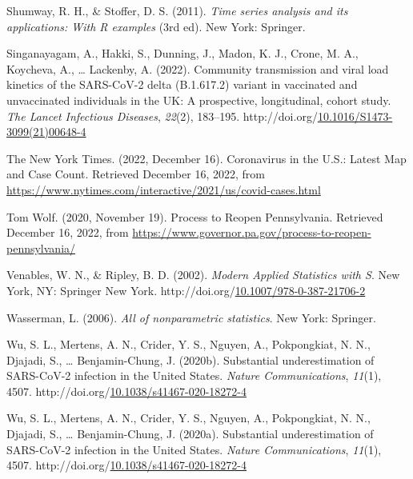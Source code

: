 \documentclass[12pt,twoside]{smiththesis}
\newlength{\cslhangindent}
\newenvironment{CSLReferences}[2] %
 {%
\setlength{\parindent}{0pt}
\ifodd #1 \everypar{\setlength{\hangindent}{\cslhangindent}}\ignorespaces\fi
\ifnum #2 > 0
\setlength{\parskip}{#2\baselineskip}
  \fi
}%
{}
\begin{document}
\begin{CSLReferences}{1}{0}
\leavevmode{}%
Shumway, R. H., \& Stoffer, D. S. (2011). \emph{Time series analysis and its applications: With {R} examples} (3rd ed). {New York}: {Springer}.

\leavevmode{}%
Singanayagam, A., Hakki, S., Dunning, J., Madon, K. J., Crone, M. A., Koycheva, A., \ldots{} Lackenby, A. (2022). Community transmission and viral load kinetics of the {SARS-CoV-2} delta ({B}.1.617.2) variant in vaccinated and unvaccinated individuals in the {UK}: A prospective, longitudinal, cohort study. \emph{The Lancet Infectious Diseases}, \emph{22}(2), 183--195. http://doi.org/\href{https://doi.org/10.1016/S1473-3099(21)00648-4}{10.1016/S1473-3099(21)00648-4}

\leavevmode{}%
The New York Times. (2022, December 16). Coronavirus in the {U}.{S}.: {Latest Map} and {Case Count}. Retrieved December 16, 2022, from \url{https://www.nytimes.com/interactive/2021/us/covid-cases.html}

\leavevmode{}%
Tom Wolf. (2020, November 19). Process to {Reopen Pennsylvania}. Retrieved December 16, 2022, from \url{https://www.governor.pa.gov/process-to-reopen-pennsylvania/}

\leavevmode{}%
Venables, W. N., \& Ripley, B. D. (2002). \emph{Modern {Applied Statistics} with {S}}. {New York, NY}: {Springer New York}. http://doi.org/\href{https://doi.org/10.1007/978-0-387-21706-2}{10.1007/978-0-387-21706-2}

\leavevmode{}%
Wasserman, L. (2006). \emph{All of nonparametric statistics}. {New York}: {Springer}.

\leavevmode{}%
Wu, S. L., Mertens, A. N., Crider, Y. S., Nguyen, A., Pokpongkiat, N. N., Djajadi, S., \ldots{} Benjamin-Chung, J. (2020b). Substantial underestimation of {SARS-CoV-2} infection in the {United States}. \emph{Nature Communications}, \emph{11}(1), 4507. http://doi.org/\href{https://doi.org/10.1038/s41467-020-18272-4}{10.1038/s41467-020-18272-4}

\leavevmode{}%
Wu, S. L., Mertens, A. N., Crider, Y. S., Nguyen, A., Pokpongkiat, N. N., Djajadi, S., \ldots{} Benjamin-Chung, J. (2020a). Substantial underestimation of {SARS-CoV-2} infection in the {United States}. \emph{Nature Communications}, \emph{11}(1), 4507. http://doi.org/\href{https://doi.org/10.1038/s41467-020-18272-4}{10.1038/s41467-020-18272-4}


\end{CSLReferences}
\end{document}
